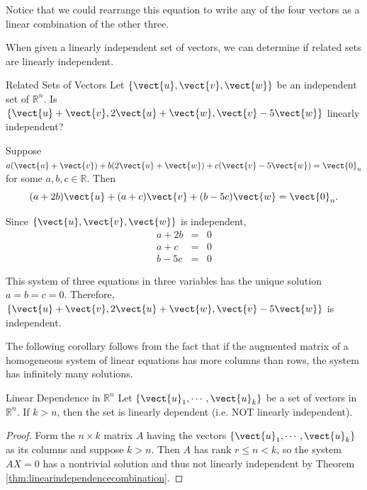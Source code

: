 \begin{solution}
Notice that we could rearrange this equation to write any of the four vectors as a linear combination of the other three. 
\end{solution}

When given a linearly independent set of vectors, we can determine if related sets are linearly independent. 

\begin{example}{Related Sets of Vectors}\label{exa:relatedlinearindependence}
Let $\{ \vect{u},\vect{v},\vect{w}\}$ be an independent set of $\mathbb{R}^n$.
Is $\{\vect{u}+\vect{v}, 2\vect{u}+\vect{w}, \vect{v}-5\vect{w}\}$ linearly
independent?
\end{example}

\begin{solution}
Suppose $a(\vect{u}+\vect{v}) + b(2\vect{u}+\vect{w}) + c(\vect{v}-5\vect{w})=\vect{0}_n$
for some $a,b,c\in\mathbb{R}$.
Then 
\[ (a+2b)\vect{u} + (a+c)\vect{v} + (b-5c)\vect{w}=\vect{0}_n.\]

Since $\{\vect{u},\vect{v},\vect{w}\}$ is independent, 
\begin{eqnarray*}
a + 2b & = & 0 \\
a + c & = & 0 \\
b - 5c & = & 0 
\end{eqnarray*}

This system of three equations in three variables has 
the unique solution $a=b=c=0$.
Therefore, $\{\vect{u}+\vect{v}, 2\vect{u}+\vect{w}, \vect{v}-5\vect{w}\}$ is independent.
\end{solution}

The following corollary follows from the fact that if the augmented matrix of a homogeneous
system of linear equations has more columns than rows, the system has infinitely many
solutions.

\begin{corollary}{Linear Dependence in $\mathbb{R}^{n}$}\label{cor:lineardependenceRn}
Let $\left\{ \vect{u}_{1},\cdots ,\vect{u}_{k}\right\} $
be a set of vectors in $\mathbb{R}^{n}$. 
If $k>n$, then the set is linearly dependent (i.e. NOT linearly independent).
\end{corollary}

\begin{proof}
Form the $n \times k$ matrix $A$ having the vectors $\left\{
\vect{u}_{1},\cdots ,\vect{u}_{k}\right\} $ as its columns and suppose $k > n$. Then $A$ has rank $r \leq n <k$, so 
the system $AX=0$ has a nontrivial solution %
 and thus not linearly independent by Theorem 
 \ref{thm:linearindependencecombination}.
\end{proof}


